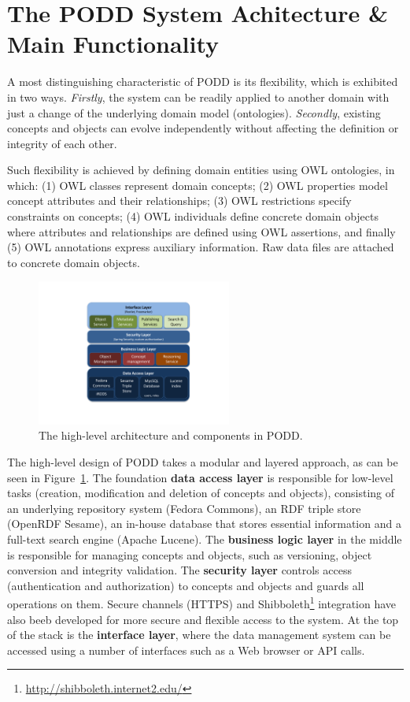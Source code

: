 \documentclass{llncs}
\begin{document}
\section{The PODD System Achitecture \& Main Functionality}\label{sec:arch}
A most distinguishing characteristic of PODD is its flexibility, which is exhibited in two ways. \emph{Firstly}, the system can be readily applied to another domain with just a change of the underlying domain model (ontologies). \emph{Secondly}, existing concepts and objects can evolve independently without affecting the definition or integrity of each other. 

Such flexibility is achieved by defining domain entities using OWL ontologies, in which: (1)
OWL classes represent domain concepts; (2) OWL properties model concept
attributes and their relationships; (3) OWL restrictions specify
constraints on concepts; (4) OWL individuals define concrete
domain objects where attributes and relationships are defined using OWL
assertions, and finally (5) OWL annotations express auxiliary information. Raw data files are attached to concrete domain objects.

\vspace{-12pt}
\begin{figure}[htb]
\centering
\includegraphics[trim = 64mm 15mm 52mm 28mm, clip,width=64mm]{podd_arch.pdf}
\vspace{-16pt} \caption{The high-level architecture and components in PODD.}\label{fig:arch}
\end{figure}

\vspace{-8pt}
The high-level design of PODD takes a modular and layered approach, as can be seen in Figure~\ref{fig:arch}. The foundation \textbf{data access layer} is responsible for low-level tasks (creation, modification and deletion of concepts and objects), consisting of an underlying repository system (Fedora Commons), an RDF triple store (OpenRDF Sesame), an in-house database
that stores essential information and a full-text search engine (Apache Lucene). The \textbf{business logic layer} in the middle is responsible for managing
concepts and objects, such as versioning, object conversion and
integrity validation. The \textbf{security layer} controls access
(authentication and authorization) to concepts and objects and guards
all operations on them. Secure channels (HTTPS) and Shibboleth\footnote{\url{http://shibboleth.internet2.edu/}} integration have also beeb developed for more secure and flexible access to the system.
At the top of the stack is the \textbf{interface layer}, where the data
management system can be accessed using a number of interfaces such as
a Web browser or API calls. 
\end{document}
